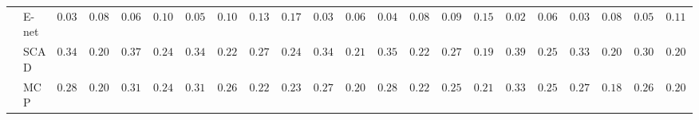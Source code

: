 \begin{tabular}{p{0.2cm}p{1cm}|p{0.6cm}p{0.6cm}|p{0.6cm}p{0.6cm}p{0.6cm}p{0.6cm}p{0.6cm}p{0.6cm}|p{0.6cm}p{0.6cm}p{0.6cm}p{0.6cm}p{0.6cm}p{0.6cm}|p{0.6cm}p{0.6cm}p{0.6cm}p{0.6cm}p{0.6cm}p{0.6cm}}
 & E-net  & $0.0383$ & $0.0849$ & $0.0600$ & $0.1047$ & $0.0567$ & $0.1039$ & $0.1350$ & $0.1799$ & $0.0317$ & $0.0699$ & $0.0450$ & $0.0882$ & $0.0917$ & $0.1542$ & $0.0250$ & $0.0643$ & $0.0350$ & $0.0831$ & $0.0583$ & $0.1170$ \\
 & SCAD  & $0.3417$ & $0.2070$ & $0.3717$ & $0.2414$ & $0.3483$ & $0.2273$ & $0.2717$ & $0.2400$ & $0.3400$ & $0.2170$ & $0.3500$ & $0.2254$ & $0.2767$ & $0.1957$ & $0.3933$ & $0.2502$ & $0.3300$ & $0.2024$ & $0.3033$ & $0.2084$ \\
 & MCP  & $0.2817$ & $0.2006$ & $0.3167$ & $0.2422$ & $0.3117$ & $0.2602$ & $0.2250$ & $0.2373$ & $0.2750$ & $0.2057$ & $0.2883$ & $0.2246$ & $0.2567$ & $0.2177$ & $0.3367$ & $0.2518$ & $0.2750$ & $0.1841$ & $0.2650$ & $0.2025$ \\
\hline 
\end{tabular}

